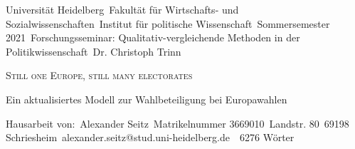 \thispagestyle{empty}
\setcounter{page}{0}
\noindent
Universität Heidelberg\
Fakultät für Wirtschafts- und Sozialwissenschaften\
Institut für politische Wissenschaft\
Sommersemester 2021\
Forschungsseminar: Qualitativ-vergleichende Methoden in der Politikwissenschaft\
Dr. Christoph Trinn\
\begin{center}
\vspace*{6cm}
\huge\textsc{Still one Europe, still many electorates}\

\LARGE{Ein aktualisiertes Modell zur Wahlbeteiligung bei Europawahlen}\
\vspace*{5.5cm}
\end{center}
\noindent
Hausarbeit von:\
Alexander Seitz\
Matrikelnummer 3669010\
Landstr. 80\
69198 Schriesheim\
alexander.seitz@stud.uni-heidelberg.de\
\
6276 Wörter
\newpage
